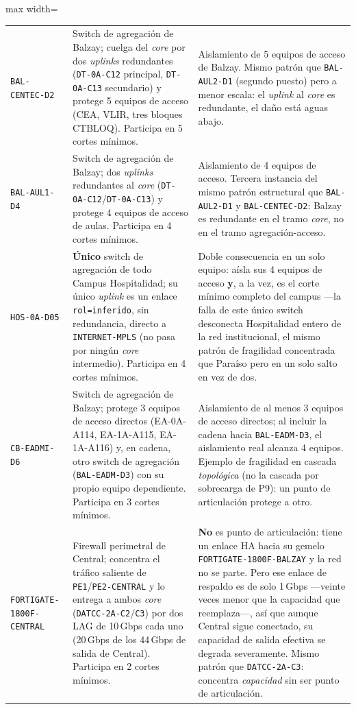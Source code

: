 \documentclass[10pt,a4paper]{extarticle}
\newcommand{\code}[1]{\texttt{\small #1}}
\begin{document}
\begin{table}[H]
\begin{adjustbox}{max width=\textwidth}
\begin{tabular}{p{3.0cm}p{5.1cm}p{5.5cm}}
\code{BAL-CENTEC-D2} &
Switch de agregación de Balzay; cuelga del \textit{core} por dos \textit{uplinks} redundantes
(\code{DT-0A-C12} principal, \code{DT-0A-C13} secundario) y protege 5 equipos de acceso
(CEA, VLIR, tres bloques CTBLOQ). Participa en 5 cortes mínimos. &
Aislamiento de 5 equipos de acceso de Balzay. Mismo patrón que \code{BAL-AUL2-D1} (segundo
puesto) pero a menor escala: el \textit{uplink} al \textit{core} es redundante, el daño está
aguas abajo. \\
\addlinespace
\code{BAL-AUL1-D4} &
Switch de agregación de Balzay; dos \textit{uplinks} redundantes al \textit{core}
(\code{DT-0A-C12}/\code{DT-0A-C13}) y protege 4 equipos de acceso de aulas. Participa en 4
cortes mínimos. &
Aislamiento de 4 equipos de acceso. Tercera instancia del mismo patrón estructural que
\code{BAL-AUL2-D1} y \code{BAL-CENTEC-D2}: Balzay es redundante en el tramo \textit{core}, no
en el tramo agregación-acceso. \\
\addlinespace
\code{HOS-0A-D05} &
\textbf{Único} switch de agregación de todo Campus Hospitalidad; su único \textit{uplink} es
un enlace \code{rol=inferido}, sin redundancia, directo a \code{INTERNET-MPLS} (no pasa por
ningún \textit{core} intermedio). Participa en 4 cortes mínimos. &
Doble consecuencia en un solo equipo: aísla sus 4 equipos de acceso \textbf{y}, a la vez, es
el corte mínimo completo del campus ---la falla de este único switch desconecta Hospitalidad
entero de la red institucional, el mismo patrón de fragilidad concentrada que Paraíso pero en
un solo salto en vez de dos. \\
\addlinespace
\code{CB-EADMI-D6} &
Switch de agregación de Balzay; protege 3 equipos de acceso directos (EA-0A-A114,
EA-1A-A115, EA-1A-A116) y, en cadena, otro switch de agregación (\code{BAL-EADM-D3}) con su
propio equipo dependiente. Participa en 3 cortes mínimos. &
Aislamiento de al menos 3 equipos de acceso directos; al incluir la cadena hacia
\code{BAL-EADM-D3}, el aislamiento real alcanza 4 equipos. Ejemplo de fragilidad en cascada
\textit{topológica} (no la cascada por sobrecarga de P9): un punto de articulación protege a
otro. \\
\addlinespace
\code{FORTIGATE-1800F-CENTRAL} &
Firewall perimetral de Central; concentra el tráfico saliente de \code{PE1}/\code{PE2-CENTRAL}
y lo entrega a ambos \textit{core} (\code{DATCC-2A-C2}/\code{C3}) por dos LAG de 10\,Gbps
cada uno (20\,Gbps de los 44\,Gbps de salida de Central). Participa en 2 cortes mínimos. &
\textbf{No} es punto de articulación: tiene un enlace HA hacia su gemelo
\code{FORTIGATE-1800F-BALZAY} y la red no se parte. Pero ese enlace de respaldo es de solo
1\,Gbps ---veinte veces menor que la capacidad que reemplaza---, así que aunque Central sigue
conectado, su capacidad de salida efectiva se degrada severamente. Mismo patrón que
\code{DATCC-2A-C3}: concentra \textit{capacidad} sin ser punto de articulación. \\
\bottomrule
\end{tabular}
\end{adjustbox}
\end{table}
\end{document}
